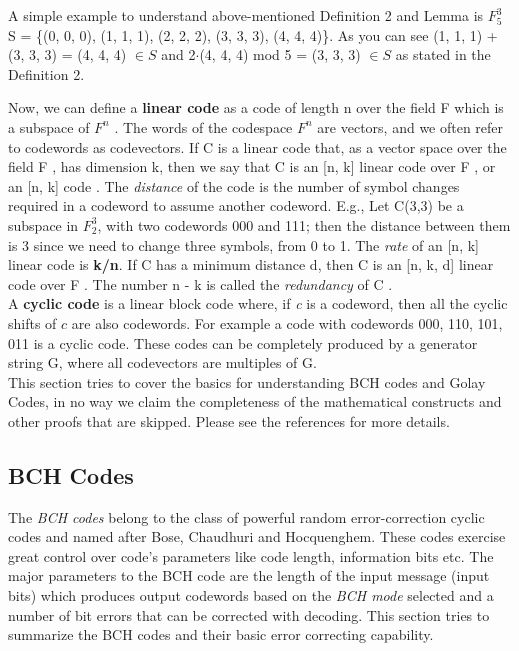 A simple example to understand above-mentioned Definition 2 and Lemma is $F_5^3$\\
S = \{(0, 0, 0), (1, 1, 1), (2, 2, 2), (3, 3, 3), (4, 4, 4)\}.
As you can see (1, 1, 1) + (3, 3, 3) = (4, 4, 4) $\in S$ and 2$\cdot$(4, 4, 4) mod 5 = (3, 3, 3) $\in S$ as stated in the Definition 2.

Now, we can define a \textbf{linear code} as a code of length n over the field F which is a subspace of $F^n$ . The words of the codespace $F^n$ are vectors, and we often refer to codewords as codevectors.
If C is a linear code that, as a vector space over the field F , has dimension k,
then we say that C is an [n, k] linear code over F , or an [n, k] code \cite{linear}. The \emph{distance} of the code is the number of symbol changes required in a codeword to assume another codeword. E.g., Let C(3,3) be a subspace in $F_2^3$, with two codewords 000 and 111; then the distance between them is 3 since we need to change three symbols, from 0 to 1.
The \emph{rate} of an [n, k] linear code is \textbf{k/n}. If C has a minimum distance d, then C is an [n, k, d] linear code over F .
The number n - k is called the \emph{redundancy} of C \cite{linear}.\\

A \textbf{cyclic code} is a linear block code where, if \emph{c} is a codeword, then all the cyclic shifts of $c$ are also codewords.
For example a code with codewords {000, 110, 101, 011} is a cyclic code.
These codes can be completely produced by a generator string G, where all codevectors are multiples of G.\\

This section tries to cover the basics for understanding BCH codes and Golay Codes, in no way we claim the completeness of the mathematical constructs and other proofs that are skipped. Please see the references for more details.\\

\subsection{BCH Codes}
\label{bch_section}
The \emph{BCH codes} belong to the class of powerful random error-correction cyclic codes and named after Bose, Chaudhuri and Hocquenghem. These codes exercise great control over code's parameters like code length, information bits etc. The major parameters to the BCH code are the length of the input message (input bits) which produces output codewords based on the \emph{BCH mode} selected and a number of bit errors that can be corrected with decoding. This section tries to summarize the BCH codes and
their basic error correcting capability.\\

